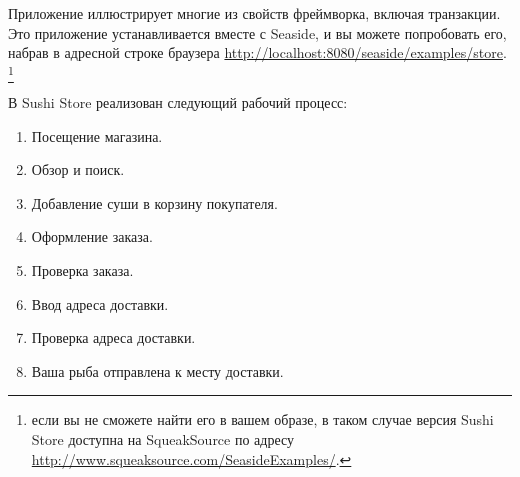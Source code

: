 \documentclass[a4paper,10pt,twoside]{book}
\begin{document}

Приложение  иллюстрирует многие из свойств
фреймворка, включая транзакции.
Это приложение устанавливается вместе с Seaside, и вы можете попробовать
его, набрав в адресной строке браузера
\url{http://localhost:8080/seaside/examples/store}.
\footnote{если вы не сможете найти его в вашем образе, в таком случае
версия Sushi Store доступна на SqueakSource по адресу
\url{http://www.squeaksource.com/SeasideExamples/}.}


В Sushi Store реализован следующий рабочий процесс:
\begin{enumerate}[itemsep=0pt]
 \item Посещение магазина.
 \item Обзор и поиск.
 \item Добавление суши в корзину покупателя.
 \item Оформление заказа.
 \item Проверка заказа.
 \item Ввод адреса доставки.
 \item Проверка адреса доставки.
 \item Ваша рыба отправлена к месту доставки.
\end{enumerate}
\end{document}

